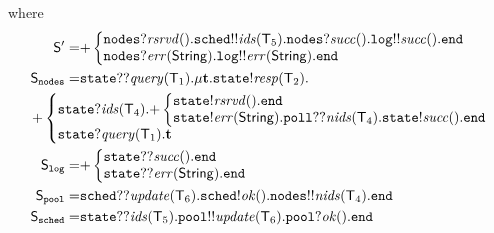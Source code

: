 where
\begin{align*}
\ST' = &
{+}
\left\{
\begin{array}{@{}l@{}}
\mathtt{nodes}{?}\mathit{rsrvd}().\mathtt{sched}{!!}\mathit{ids}(\T_5).\mathtt{nodes}{?}\mathit{succ}().\mathtt{log}{!!}\mathit{succ}().\tend\\
\mathtt{nodes}{?}\mathit{err}(\mathsf{String}).\mathtt{log}{!!}\mathit{err}(\mathsf{String}).\tend
\end{array} \right.\\
%
\ST_\mathtt{nodes} =  &
\mathtt{state}{??}\mathit{query}(\T_1).
\mu \ty.
\mathtt{state}{!}\mathit{resp}(\T_2).\\
& \hspace{-12mm}
{+}
\left\{
\begin{array}{@{}l@{}}
\mathtt{state}{?}\mathit{ids}(\T_4).
{+}\left\{
\begin{array}{@{}l@{}}
\mathtt{state}{!}\mathit{rsrvd}().\tend\\
\mathtt{state}{!}\mathit{err}(\mathsf{String}).\mathtt{poll}{??}\mathit{nids}(\T_4).\mathtt{state}{!}\mathit{succ}().\tend
\end{array} \right.	\\
\mathtt{state}{?}\mathit{query}(\T_1).\ty
\end{array} \right.\\
%
\ST_\mathtt{log} =& 
{+}
\left\{
\begin{array}{@{}l@{}}
\mathtt{state}{??}\mathit{succ}().\tend\\
\mathtt{state}{??}\mathit{err}(\mathsf{String}).\tend
\end{array} \right.\\
%
\ST_\mathtt{pool} =&
\mathtt{sched}{??}\mathit{update}(\T_6).
\mathtt{sched}{!}\mathit{ok}(). 
\mathtt{nodes}{!!}\mathit{nids}(\T_4).\tend\\
\ST_\mathtt{sched} =& 
\mathtt{state}{??}\mathit{ids}(\T_5).
\mathtt{pool}{!!}\mathit{update}(\T_6).
\mathtt{pool}{?}\mathit{ok}().\tend
\end{align*}

